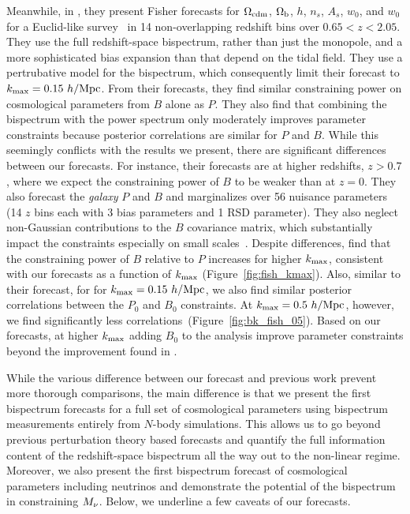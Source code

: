 Meanwhile, in \cite{yankelevich2019}, they present Fisher forecasts for 
$\Omega_{\rm cdm}$, $\Omega_{\rm b}$, $h$, $n_s$, $A_s$, $w_0$, and $w_0$ for a 
Euclid-like survey~\citep{laureijs2011} in 14 non-overlapping redshift 
bins over $0.65 < z < 2.05$. They use the full redshift-space bispectrum,
rather than just the monopole, and a more sophisticated bias expansion 
than \cite{sefusatti2006} that depend on the tidal field. They use a 
pertrubative model for the bispectrum, which consequently limit their 
forecast to $k_{\rm max} = 0.15~h/{\rm Mpc}$. From their forecasts, they find 
similar constraining power on cosmological parameters from $B$ alone as $P$. 
They also find that combining the bispectrum with the power spectrum 
only moderately improves parameter constraints because posterior 
correlations are similar for $P$ and $B$. While this seemingly conflicts 
with the results we present, there are significant differences between our 
forecasts. For instance, their forecasts are at higher redshifts, $z > 0.7$,
where we expect the constraining power of $B$ to be weaker than at $z=0$. 
They also forecast the {\em galaxy} $P$ and $B$ and marginalizes over 
56 nuisance parameters (14 $z$ bins each with 3 bias parameters and 1 
RSD parameter). They also neglect non-Gaussian contributions to the $B$ 
covariance matrix, which substantially impact the constraints especially 
on small scales~\citep{chan2017}. %
Despite differences, \cite{yankelevich2019} find that the constraining 
power of $B$ relative to $P$ increases for higher $k_{\rm max}$, consistent 
with our forecasts as a function of $k_{\rm max}$ (Figure~\ref{fig:fish_kmax}). 
Also, similar to their forecast, for for $k_{\rm max} = 0.15~h/{\rm Mpc}$, 
we also find similar posterior correlations between the $P_0$ and $B_0$ 
constraints. At $k_{\rm max} = 0.5~h/{\rm Mpc}$, however, we find significantly 
less correlations~(Figure~\ref{fig:bk_fish_05}). Based on our forecasts, 
at higher $k_{\rm max}$ adding $B_0$ to the analysis improve parameter 
constraints beyond the improvement found in \cite{yankelevich2019}. 

While the various difference between our forecast and previous work 
prevent more thorough comparisons, the main difference is that we 
present the first bispectrum forecasts for a full set of cosmological 
parameters using bispectrum measurements entirely from $N$-body 
simulations. This allows us to go beyond previous perturbation theory 
based forecasts and quantify the full information content of the 
redshift-space bispectrum all the way out to the non-linear regime. 
Moreover, we also present the first bispectrum forecast of cosmological
parameters including neutrinos and demonstrate the potential of the 
bispectrum in constraining $M_\nu$. Below, we underline a few caveats 
of our forecasts.

